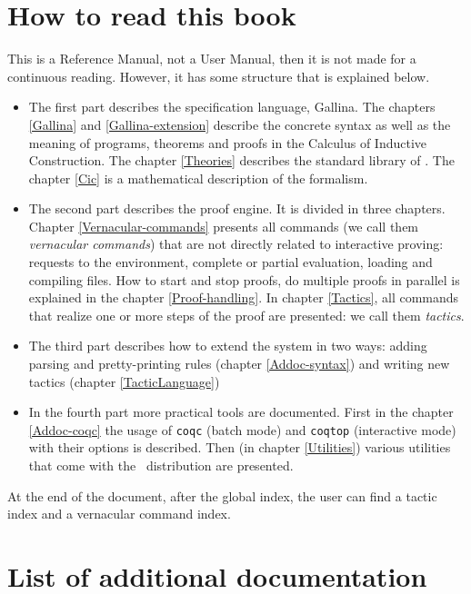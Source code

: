 \section*{How to read this book}

This is a Reference Manual, not a User Manual, then it is not made for a
continuous reading. However, it has some structure that is explained
below.

\begin{itemize}
\item The first part describes the specification language,
  Gallina. The chapters \ref{Gallina} and \ref{Gallina-extension}
  describe the concrete syntax as well as the meaning of programs,
  theorems and proofs in the Calculus of Inductive Construction. The
  chapter \ref{Theories} describes the standard library of \Coq. The
  chapter \ref{Cic} is a mathematical description of the formalism. 

\item The second part describes the proof engine. It is divided in
  three chapters. Chapter \ref{Vernacular-commands} presents
  all commands (we call them \textit{vernacular commands}) that are not
  directly related to interactive proving: requests to the environment,
  complete or partial evaluation, loading and compiling files. How to
  start and stop proofs, do multiple proofs in parallel is explained
  in the chapter \ref{Proof-handling}. In chapter \ref{Tactics}, 
  all commands that realize one or more steps of the proof are
  presented: we call them   \textit{tactics}. 

\item The third part describes how to extend the system in two ways:
  adding parsing and pretty-printing rules (chapter
  \ref{Addoc-syntax}) and writing new tactics (chapter
  \ref{TacticLanguage})


\item In the fourth part more practical tools are documented. First in
  the chapter \ref{Addoc-coqc} the usage of \texttt{coqc} (batch mode)
  and \texttt{coqtop} (interactive mode) with their options is
  described. Then (in chapter \ref{Utilities}) 
  various utilities that come with the \Coq\ distribution are presented.
\end{itemize}

At the end of the document, after the global index, the user can find
a tactic index and a vernacular command index.

\section*{List of additional documentation}

